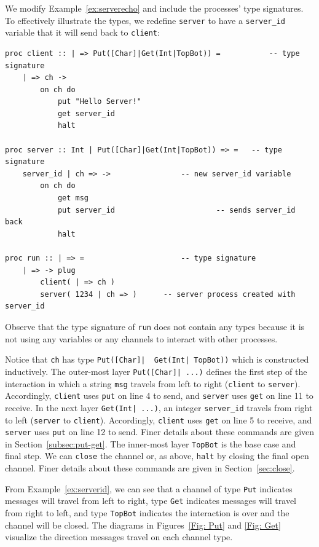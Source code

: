 \documentclass[acmsmall]{acmart}
\begin{document}
We modify Example~\ref{ex:serverecho} and include the processes' type signatures.
To effectively illustrate the types, we redefine \lstinline$server$ to have a \lstinline$server_id$ variable that it will send back to  \lstinline$client$:

\begin{lstlisting}[label=ex:serverid, caption=Server replies to Client with server id] 
proc client :: | => Put([Char]|Get(Int|TopBot)) = 			-- type signature
	| => ch ->
		on ch do 
			put "Hello Server!"	
			get server_id					
			halt

proc server :: Int | Put([Char]|Get(Int|TopBot)) => = 	-- type signature
	server_id | ch => ->				-- new server_id variable
		on ch do
			get msg							
			put server_id						-- sends server_id back
			halt
			
proc run :: | => = 						-- type signature
 	| => -> plug					
 		client( | => ch )		
 		server( 1234 | ch => )		-- server process created with server_id
\end{lstlisting}
Observe that the type signature of \lstinline$run$ does not contain any types because it is not using any variables or any channels to interact with other processes.

Notice that \lstinline$ch$ has type \lstinline$Put([Char]|  Get(Int| TopBot))$ which is constructed inductively. 
The outer-most layer \lstinline$Put([Char]| ...)$ defines the first step of the interaction in which a string \lstinline$msg$ travels from left to right (\lstinline$client$ to \lstinline$server$). 
Accordingly, \lstinline$client$ uses \lstinline$put$ on line 4 to send, and \lstinline$server$ uses \lstinline$get$ on line 11 to receive. 
In the next layer \lstinline$Get(Int| ...)$, an integer \lstinline$server_id$ travels from right to left (\lstinline$server$ to \lstinline$client$).
Accordingly, \lstinline$client$ uses \lstinline$get$ on line 5 to receive, and \lstinline$server$ uses \lstinline$put$ on line 12 to send.
Finer details about these commands are given in Section~\ref{subsec:put-get}. 
The inner-most layer \lstinline$TopBot$ is the base case and final step. 
We can \lstinline$close$ the channel or, as above, \lstinline$halt$ by closing the final open channel.
Finer details about these commands are given in Section~\ref{sec:close}. 

From Example~\ref{ex:serverid}, we can see that a channel of type \lstinline$Put$ indicates messages will travel from left to right, type \lstinline$Get$ indicates messages will travel from right to left, and type \lstinline$TopBot$ indicates the interaction is over and the channel will be closed.
The diagrams in Figures~\ref{Fig: Put} and \ref{Fig: Get} visualize the direction messages travel on each channel type.
\end{document}
